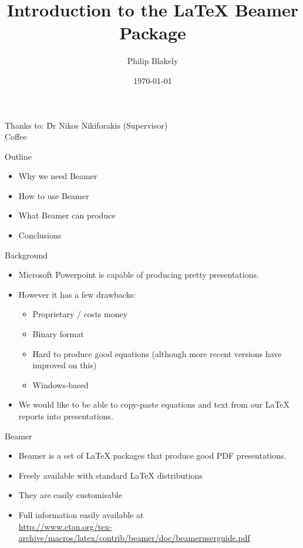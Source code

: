 \documentclass[xcolor=table]{beamer}
\title[Beamer Intro]{Introduction to the \LaTeX{} Beamer Package}
\author{Philip Blakely}
\institute[LSC]{Laboratory for Scientific Computing, University of Cambridge}
\date{\today}
\numberwithin{equation}{section}
\begin{document}
\begin{frame}
  \titlepage
  \begin{tabbing}
    Thanks to:  \= Dr Nikos Nikiforakis (Supervisor)\\
    \>Coffee
  \end{tabbing}
\end{frame}

\begin{frame}{Outline}
\begin{itemize}
\item Why we need Beamer
\item How to use Beamer
\item What Beamer can produce
\item Conclusions
\end{itemize}
\end{frame}

\begin{frame}{Background}
\begin{itemize}[<+->]
\item Microsoft Powerpoint is capable of producing pretty
  presentations.
\item However it has a few drawbacks:
\begin{itemize}
\item Proprietary / costs money
\item Binary format
\item Hard to produce good equations (although more recent versions
  have improved on this)
\item Windows-based
\end{itemize}
\item We would like to be able to copy-paste equations and text from
  our \LaTeX{} reports into presentations.
\end{itemize}
\end{frame}

\begin{frame}{Beamer}
\begin{itemize}
\item Beamer is a set of \LaTeX{} packages that produce good PDF
  presentations.
\item Freely available with standard \LaTeX{} distributions
\item They are easily customisable
\item Full information easily available at\\
 \url{http://www.ctan.org/tex-archive/macros/latex/contrib/beamer/doc/beameruserguide.pdf}
\end{itemize}
\end{frame}
\end{document}
